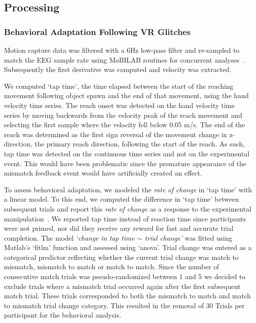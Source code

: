 \subsection{Processing}

\subsubsection{Behavioral Adaptation Following VR Glitches}

Motion capture data was filtered with a 6Hz low-pass filter and re-sampled to match the EEG sample rate using MoBILAB routines for concurrent analyses~\cite{Ojeda2014-ev}. Subsequently the first derivative was computed and velocity was extracted. 

We computed `tap time', the time elapsed between the start of the reaching movement following object spawn and the end of that movement, using the hand velocity time series. The reach onset was detected on the hand velocity time series by moving backwards from the velocity peak of the reach movement and selecting the first sample where the velocity fell below 0.05 m/s. The end of the reach was determined as the first sign reversal of the movement change in z-direction, the primary reach direction, following the start of the reach. As such, tap time was detected on the continuous time series and not on the experimental event. This would have been problematic since the premature appearance of the mismatch feedback event would have artificially created an effect.

To assess behavioral adaptation, we modeled the \textit{rate of change} in `tap time' with a linear model. To this end, we computed the difference in `tap time' between subsequent trials and report this \textit{rate of change} as a response to the experimental manipulation~\cite{Dutilh2012-ps}. We reported tap time instead of reaction time since participants were not primed, nor did they receive any reward for fast and accurate trial completion. The model \textit{`change in tap time $\sim$ trial change'} was fitted using Matlab's `fitlm' function and assessed using `anova'. Trial change was entered as a categorical predictor reflecting whether the current trial change was match to mismatch, mismatch to match or match to match. Since the number of consecutive match trials was pseudo-randomized between 1 and 5 we decided to exclude trials where a mismatch trial occurred again after the first subsequent match trial. These trials corresponded to both the mismatch to match and match to mismatch trial change category. This resulted in the removal of 30 Trials per participant for the behavioral analysis.

